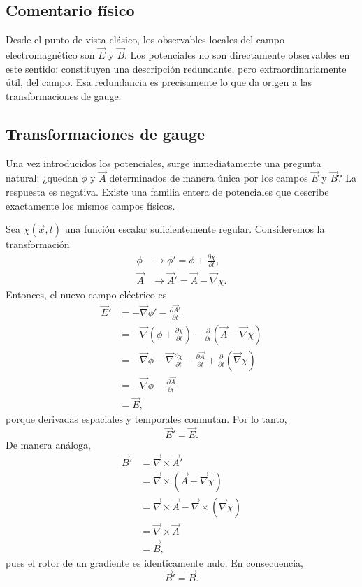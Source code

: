 \documentclass[12pt,a4paper]{article}
\theoremstyle{definition}
\theoremstyle{plain}
\numberwithin{equation}{section}
\theoremstyle{remark}
\newcommand{\E}{\vec{E}}
\newcommand{\B}{\vec{B}}
\begin{document}
\subsection*{Comentario físico}
Desde el punto de vista clásico, los observables locales del campo electromagnético son $\E$ y $\B$. Los potenciales no son directamente observables en este sentido: constituyen una descripción redundante, pero extraordinariamente útil, del campo. Esa redundancia es precisamente lo que da origen a las transformaciones de gauge.

\subsection*{Transformaciones de gauge}

Una vez introducidos los potenciales, surge inmediatamente una pregunta natural: ¿quedan $\phi$ y $\vec A$ determinados de manera única por los campos $\E$ y $\B$? La respuesta es negativa. Existe una familia entera de potenciales que describe exactamente los mismos campos físicos.

Sea $\chi(\vec x,t)$ una función escalar suficientemente regular. Consideremos la transformación
\begin{align*}
    \phi &\rightarrow \phi' = \phi + \frac{\partial \chi}{\partial t}, \\
    \vec A &\rightarrow \vec A' = \vec A - \vec\nabla\chi.
\end{align*}
Entonces, el nuevo campo eléctrico es
\begin{align*}
    \E' &= -\vec\nabla \phi' - \frac{\partial \vec A'}{\partial t} \\
    &= -\vec\nabla\left(\phi + \frac{\partial \chi}{\partial t}\right) - \frac{\partial}{\partial t}\left(\vec A - \vec\nabla\chi\right) \\
    &= -\vec\nabla\phi - \vec\nabla\frac{\partial \chi}{\partial t} - \frac{\partial \vec A}{\partial t} + \frac{\partial}{\partial t}\left(\vec\nabla\chi\right) \\
    &= -\vec\nabla\phi - \frac{\partial \vec A}{\partial t} \\
    &= \E,
\end{align*}
porque derivadas espaciales y temporales conmutan. Por lo tanto,
\begin{equation*}
    \E' = \E.
\end{equation*}
De manera análoga,
\begin{align*}
    \B' &= \vec\nabla\times\vec A' \\
    &= \vec\nabla\times\left(\vec A - \vec\nabla\chi\right) \\
    &= \vec\nabla\times\vec A - \vec\nabla\times\left(\vec\nabla\chi\right) \\
    &= \vec\nabla\times\vec A \\
    &= \B,
\end{align*}
pues el rotor de un gradiente es identicamente nulo. En consecuencia,
\begin{equation*}
    \B' = \B.
\end{equation*}
\end{document}
